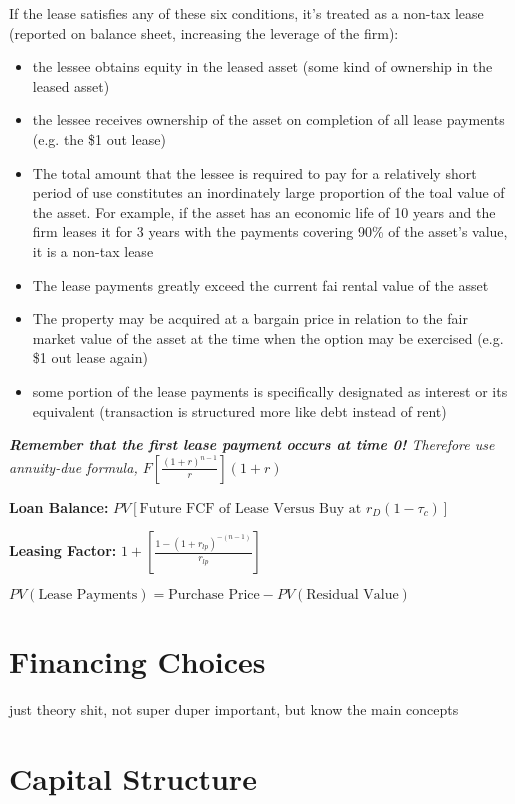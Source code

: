 \documentclass{report}
\begin{document}
\vspace*{1\baselineskip}
If the lease satisfies any of these six conditions, it's treated as a non-tax lease (reported on balance sheet, increasing the leverage of the firm):
\begin{itemize}
\item the lessee obtains equity in the leased asset (some kind of ownership in the leased asset)
\item the lessee receives ownership of the asset on completion of all lease payments (e.g. the \$1 out lease)
\item The total amount that the lessee is required to pay for a relatively short period of use constitutes an inordinately large proportion of the toal value of the asset. For example, if the asset has an economic life of 10 years and the firm leases it for 3 years with the payments covering 90\% of the asset's value, it is a non-tax lease
\item The lease payments greatly exceed the current fai rental value of the asset
\item The property may be acquired at a bargain price in relation to the fair market value of the asset at the time when the option may be exercised (e.g. \$1 out lease again)
\item some portion of the lease payments is specifically designated as interest or its equivalent (transaction is structured more like debt instead of rent)
\end{itemize}
\textit{\textbf{Remember that the first lease payment occurs at time 0!} Therefore use \emph{annuity-due formula}, $F[\frac{(1+r)^{n-1}}{r}](1+r)$}
\vspace*{1\baselineskip}

\textbf{Loan Balance:} $PV[\mbox{Future FCF of Lease Versus Buy at } r_D(1-\tau_c)]$

\textbf{Leasing Factor:} $1+[\frac{1-(1+r_{lp})^{-(n-1)}}{r_{lp}}]$

\vspace*{1\baselineskip}
$PV(\mbox{Lease Payments}) = \mbox{Purchase Price} - PV(\mbox{Residual Value})$

\section{Financing Choices}
\label{sec:financ-choic}

just theory shit, not super duper important, but know the main concepts

\section{Capital Structure}
\label{sec:capital-structure-1}
\end{document}
